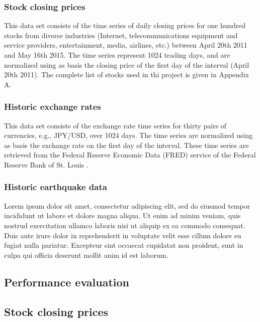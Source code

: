 \documentclass{article}
\begin{document}
\subsubsection{Stock closing prices}

This data set consists of the time series of daily closing prices for one hundred stocks from diverse industries (Internet, telecommunications equipment and service providers, entertainment, media, airlines, etc.) between April 20th 2011 and May 16th 2015. The time series represent 1024 trading days, and are normalized using as basis the closing price of the first day of the interval (April 20th 2011). The complete list of stocks used in thi project is given in Appendix A.

\subsubsection{Historic exchange rates}

This data set consists of the exchange rate time series for thirty pairs of currencies, e.g., JPY/USD, over 1024 days. The time series are normalized using as basis the exchange rate on the first day of the interval. These time series are retrieved from the Federal Reserve Economic Data (FRED) service of the Federal Reserve Bank of St. Louis \cite{FRED15}.


\subsubsection{Historic earthquake data}

Lorem ipsum dolor sit amet, consectetur adipiscing elit, sed do eiusmod tempor incididunt ut labore et dolore magna aliqua. Ut enim ad minim veniam, quis nostrud exercitation ullamco laboris nisi ut aliquip ex ea commodo consequat. Duis aute irure dolor in reprehenderit in voluptate velit esse cillum dolore eu fugiat nulla pariatur. Excepteur sint occaecat cupidatat non proident, sunt in culpa qui officia deserunt mollit anim id est laborum.



\subsection{Performance evaluation}


\subsection{Stock closing prices}
\end{document}
